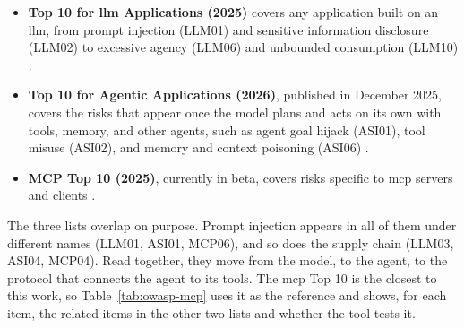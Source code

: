 \begin{itemize}
  \item \textbf{Top 10 for \gls{llm} Applications (2025)} covers any application built on an \gls{llm}, from prompt injection (LLM01) and sensitive information disclosure (LLM02) to excessive agency (LLM06) and unbounded consumption (LLM10) \citep{owasp2025llmtop10}.
  \item \textbf{Top 10 for Agentic Applications (2026)}, published in December 2025, covers the risks that appear once the model plans and acts on its own with tools, memory, and other agents, such as agent goal hijack (ASI01), tool misuse (ASI02), and memory and context poisoning (ASI06) \citep{owasp2026agentic}.
  \item \textbf{MCP Top 10 (2025)}, currently in beta, covers risks specific to \gls{mcp} servers and clients \citep{owasp2025mcptop10}.
\end{itemize}

The three lists overlap on purpose. Prompt injection appears in all of them under different names (LLM01, ASI01, MCP06), and so does the supply chain (LLM03, ASI04, MCP04). Read together, they move from the model, to the agent, to the protocol that connects the agent to its tools. The \gls{mcp} Top 10 is the closest to this work, so Table~\ref{tab:owasp-mcp} uses it as the reference and shows, for each item, the related items in the other two lists and whether the tool tests it.


